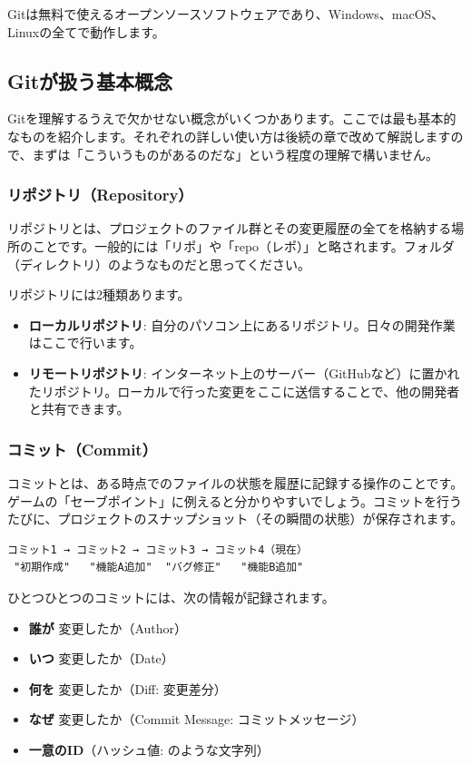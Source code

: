 Gitは無料で使えるオープンソースソフトウェアであり、Windows、macOS、Linuxの全てで動作します。

\subsection{Gitが扱う基本概念}

Gitを理解するうえで欠かせない概念がいくつかあります。ここでは最も基本的なものを紹介します。それぞれの詳しい使い方は後続の章で改めて解説しますので、まずは「こういうものがあるのだな」という程度の理解で構いません。

\subsubsection{リポジトリ（Repository）}

リポジトリとは、プロジェクトのファイル群とその変更履歴の全てを格納する場所のことです。一般的には「リポ」や「repo（レポ）」と略されます。フォルダ（ディレクトリ）のようなものだと思ってください。

リポジトリには2種類あります。

\begin{itemize}
  \item \textbf{ローカルリポジトリ}: 自分のパソコン上にあるリポジトリ。日々の開発作業はここで行います。
  \item \textbf{リモートリポジトリ}: インターネット上のサーバー（GitHubなど）に置かれたリポジトリ。ローカルで行った変更をここに送信することで、他の開発者と共有できます。
\end{itemize}

\subsubsection{コミット（Commit）}

コミットとは、ある時点でのファイルの状態を履歴に記録する操作のことです。ゲームの「セーブポイント」に例えると分かりやすいでしょう。コミットを行うたびに、プロジェクトのスナップショット（その瞬間の状態）が保存されます。

\begin{lstlisting}[language={}]
コミット1 → コミット2 → コミット3 → コミット4（現在）
 "初期作成"   "機能A追加"  "バグ修正"   "機能B追加"
\end{lstlisting}

ひとつひとつのコミットには、次の情報が記録されます。

\begin{itemize}
  \item \textbf{誰が} 変更したか（Author）
  \item \textbf{いつ} 変更したか（Date）
  \item \textbf{何を} 変更したか（Diff: 変更差分）
  \item \textbf{なぜ} 変更したか（Commit Message: コミットメッセージ）
  \item \textbf{一意のID}（ハッシュ値:  のような文字列）
\end{itemize}

